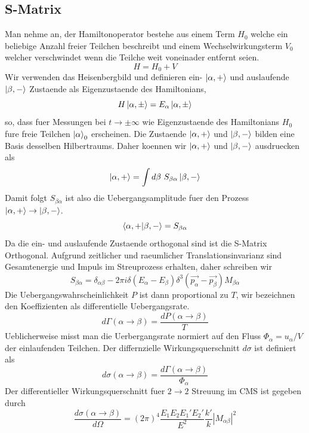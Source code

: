 \documentclass[11pt,a4paper,twocolumn]{article}
\begin{document}
\subsection{S-Matrix}
Man nehme an, der Hamiltonoperator bestehe aus einem Term $H_0$ welche ein 
beliebige Anzahl freier Teilchen beschreibt und einem Wechselwirkungsterm $V_0$
welcher verschwindet wenn die Teilche weit voneinader entfernt seien.
\begin{equation}
		H = H_0 + V
\end{equation}
Wir verwenden das Heisenbergbild und definieren ein- $\ket{\alpha, +}$ und
auslaufende $\ket{\beta, -}$ Zustaende als Eigenzustaende des Hamiltonians,
\begin{equation}
		H \ket{\alpha, \pm} = E_{\alpha} \ket{\alpha, \pm}
\end{equation}
so, dass fuer Messungen bei $t \to \pm \infty$ wie Eigenzustaende des Hamiltonians
$H_0$ fure freie Teilchen $\ket{\alpha}_0$ erscheinen.
Die Zustaende $\ket{\alpha, +}$ und $\ket{\beta, -}$ bilden eine Basis desselben
Hilbertraums. Daher koennen wir $\ket{\alpha, +}$ und $\ket{\beta, -}$
ausdruecken als 
\begin{equation}
		\ket{\alpha, +} = \int d\beta \ S_{\beta \alpha} \ket{\beta, -}
\end{equation}
Damit folgt $S_{\beta \alpha}$ ist also die Uebergangsamplitude fuer den Prozess
$\ket{\alpha, +} \to \ket{\beta, -}$.
\begin{equation}
		\bra{\alpha, +} \ket{\beta, -} =S_{\beta \alpha}
\end{equation}
Da die ein- und auslaufende Zustaende orthogonal sind ist die S-Matrix
Orthogonal.
Aufgrund zeitlicher und raeumlicher Translationsinvarianz sind Gesamtenergie und
Impuls im Streuprozess erhalten, daher schreiben wir
\begin{equation}
		S_{\beta \alpha} = \delta_{\alpha \beta} - 2 \pi i \delta(E_{\alpha} -
		E_{\beta})\delta^3(\vec{p_{\alpha}}-\vec{p_{\beta}}) M_{\beta \alpha}
\end{equation}
Die Uebergangswahrscheinlichkeit $P$ ist dann proportional zu $T$, wir
bezeichnen den Koeffizienten als differentielle Uebergangsrate.
\begin{equation}
		d\Gamma(\alpha \to \beta) = \frac{dP(\alpha \to \beta)}{T}
\end{equation}
Ueblicherweise misst man die Uerbergangsrate normiert auf den Fluss
$\Phi_{\alpha} = u_{\alpha}/V$ der einlaufenden Teilchen.
Der differnzielle Wirkungsquerschnitt $d\sigma$ ist definiert als
\begin{equation}
		d\sigma(\alpha \to \beta) = \frac{d\Gamma(\alpha \to
		\beta)}{\Phi_{\alpha}}
\end{equation}
Der differentieller Wirkungsquerschnitt fuer $2 \to 2$ Streuung im CMS ist
gegeben durch
\begin{equation}
		\frac{d\sigma(\alpha \to \beta)}{d\Omega} = (2\pi)^4 \frac{E_1 E_2
		E_1' E_2'}{E^2} \frac{k'}{k} |M_{\alpha \beta}|^2
\end{equation}
\end{document}
